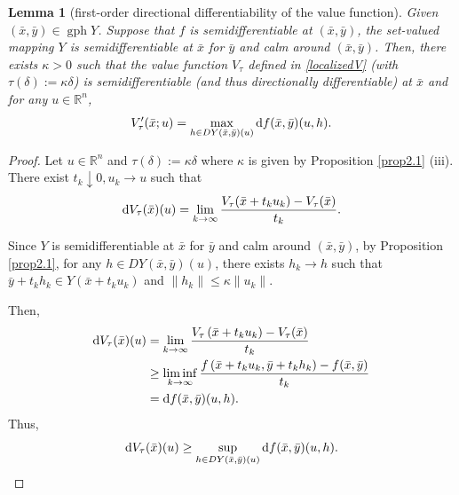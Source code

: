 \documentclass[11pt]{article}
\numberwithin{equation}{section}
\newtheorem{lemma}{Lemma}[section]
\begin{document}
{\begin{lemma}[first-order directional differentiability of the value function]\label{prop4.1}
Given $(\bar x,\bar y)\in \operatorname{gph}Y$. Suppose that $f$ is semidifferentiable at $(\bar x,\bar y)$, the set-valued mapping $Y$ is semidifferentiable at $\bar x$ for $\bar y$ and calm around $(\bar x,\bar y)$. Then, there exists $\kappa>0$ such that the value function $V_{\tau}$ defined in \eqref{localizedV} (with $\tau(\delta):=\kappa \delta$)
 is semidifferentiable (and thus directionally differentiable) at $\bar x$ and for any $u \in \mathbb{R}^n$,
$$V_{\tau}'(\bar x;u) = \max\limits_{h \in D Y(\bar x,\bar y)(u)} {\rm d} f(\bar x,\bar y)(u,h). $$
\end{lemma}
\begin{proof}
Let $u \in \mathbb{R}^n$ and $\tau(\delta):=\kappa \delta$ where $\kappa$ is given by Proposition \ref{prop2.1} (iii). There exist $t_k \downarrow 0, u_k \to u$ such that 
$${\rm d} V_{\tau} (\bar x)(u) = \lim\limits_{k \to \infty} \frac{V_{\tau}( \bar x+t_ku_k) - V_{\tau}(\bar x)}{t_k}.$$

Since $Y$ is semidifferentiable at $\bar x$ for $\bar y$ and calm around $(\bar x,\bar y)$, by Proposition \ref{prop2.1}, for any $h \in D Y(\bar x,\bar y)(u)$, there exists $h_k \to h$ such that $\bar y+t_kh_k \in Y(\bar x+t_ku_k)$ and $\|h_k\| \leq \kappa \|u_k\|$.

Then,
\begin{equation*}
\begin{aligned}
{\rm d} V_{\tau}(\bar x)(u)  & = \lim\limits_{k \to \infty} \frac{V_{\tau}\left(\bar{x}+t_ku_k\right)-V_{\tau}(\bar{x})}{t_k} \\
&\geq \liminf\limits_{k \to \infty} \frac{f\left(\bar{x}+t_k u_k, \bar{y}+t_k h_k\right)-f(\bar{x}, \bar{y})}{t_k} \\
&=  {\rm d} f(\bar x,\bar y)(u,h).
\end{aligned}
\end{equation*}
Thus, \begin{equation}\label{star}{\rm d} V_{\tau}(\bar x)(u)  \geq \sup_{h \in D Y(\bar x,\bar y)(u)} {\rm d} f(\bar x,\bar y)(u,h).\end{equation}


\end{proof}}
\end{document}
